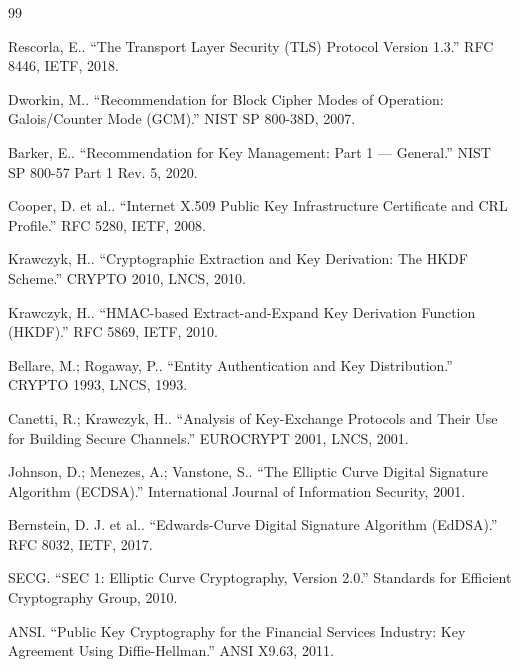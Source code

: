 \clearpage
{}
{}
\label{ch:references}

\begin{thebibliography}{99}

\label{ref:1}
Rescorla, E.. ``The Transport Layer Security (TLS) Protocol Version 1.3.'' RFC 8446, IETF, 2018.

\label{ref:2}
Dworkin, M.. ``Recommendation for Block Cipher Modes of Operation: Galois/Counter Mode (GCM).'' NIST SP 800-38D, 2007.

\label{ref:3}
Barker, E.. ``Recommendation for Key Management: Part 1 --- General.'' NIST SP 800-57 Part 1 Rev. 5, 2020.

\label{ref:4}
Cooper, D. et al.. ``Internet X.509 Public Key Infrastructure Certificate and CRL Profile.'' RFC 5280, IETF, 2008.

\label{ref:5}
Krawczyk, H.. ``Cryptographic Extraction and Key Derivation: The HKDF Scheme.'' CRYPTO 2010, LNCS, 2010.

\label{ref:6}
Krawczyk, H.. ``HMAC-based Extract-and-Expand Key Derivation Function (HKDF).'' RFC 5869, IETF, 2010.

\label{ref:7}
Bellare, M.; Rogaway, P.. ``Entity Authentication and Key Distribution.'' CRYPTO 1993, LNCS, 1993.

\label{ref:8}
Canetti, R.; Krawczyk, H.. ``Analysis of Key-Exchange Protocols and Their Use for Building Secure Channels.'' EUROCRYPT 2001, LNCS, 2001.

\label{ref:9}
Johnson, D.; Menezes, A.; Vanstone, S.. ``The Elliptic Curve Digital Signature Algorithm (ECDSA).'' International Journal of Information Security, 2001.

\label{ref:10}
Bernstein, D. J. et al.. ``Edwards-Curve Digital Signature Algorithm (EdDSA).'' RFC 8032, IETF, 2017.

\label{ref:11}
SECG. ``SEC 1: Elliptic Curve Cryptography, Version 2.0.'' Standards for Efficient Cryptography Group, 2010.

\label{ref:12}
ANSI. ``Public Key Cryptography for the Financial Services Industry: Key Agreement Using Diffie-Hellman.'' ANSI X9.63, 2011.


\end{thebibliography}

